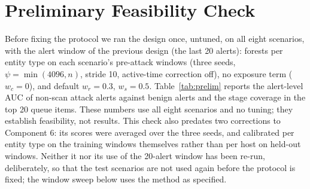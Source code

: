 \documentclass[conference]{IEEEtran}
\begin{document}
\section{Preliminary Feasibility Check}
\label{sec:prelim}

Before fixing the protocol we ran the design once, untuned, on all eight scenarios, with the alert window of the previous design (the last 20 alerts): forests per entity type on each scenario's pre-attack windows (three seeds, $\psi = \min(4096, n)$, stride 10, active-time correction off), no exposure term ($w_c = 0$), and default $w_r = 0.3$, $w_s = 0.5$. Table~\ref{tab:prelim} reports the alert-level AUC of non-scan attack alerts against benign alerts and the stage coverage in the top 20 queue items. These numbers use all eight scenarios and no tuning; they establish feasibility, not results. This check also predates two corrections to Component 6: its scores were averaged over the three seeds, and calibrated per entity type on the training windows themselves rather than per host on held-out windows. Neither it nor its use of the 20-alert window has been re-run, deliberately, so that the test scenarios are not used again before the protocol is fixed; the window sweep below uses the method as specified.
\end{document}
